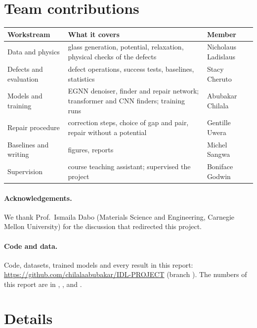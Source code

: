 \documentclass[10pt]{article}
\newcommand{\repo}{\url{https://github.com/chilalaabubakar/IDL-PROJECT}}
\begin{document}
\section*{Team contributions}
\small
\begin{tabularx}{\linewidth}{@{}l>{\raggedright\arraybackslash}Xl@{}}
\toprule
Workstream & What it covers & Member \\
\midrule
Data and physics & glass generation, potential, relaxation, physical checks of the defects & Nicholaus Ladislaus \\
Defects and evaluation & defect operations, success tests, baselines, statistics & Stacy Cheruto \\
Models and training & EGNN denoiser, finder and repair network; transformer and CNN finders; training runs & Abubakar Chilala \\
Repair procedure & correction steps, choice of gap and pair, repair without a potential & Gentille Uwera \\
Baselines and writing & figures, reports & Michel Sangwa \\
Supervision & course teaching assistant; supervised the project & Boniface Godwin \\
\bottomrule
\end{tabularx}
\normalsize

\paragraph{Acknowledgements.} We thank Prof.\ Ismaila Dabo (Materials Science and Engineering, Carnegie Mellon University) for the discussion that redirected this project.

\paragraph{Code and data.} {\raggedright Code, datasets, trained models and every result in this report: \repo{} (branch ). The numbers of this report are in , ,  and .\par}


{\small}

\clearpage
\appendix

\section{Details}
\label{app:details}
\end{document}
